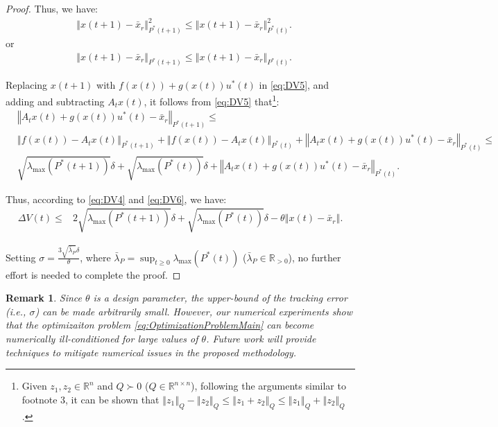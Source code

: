 \documentclass[1p,times]{elsarticle}
\newtheorem{remark}{Remark}
\begin{document}
\begin{proof}
Thus, we have:
\begin{align}\label{eq:DV5}
&\left\Vert x(t+1)-\bar{x}_r\right\Vert_{P^\ast(t+1)}^2\leq\left\Vert x(t+1)-\bar{x}_r\right\Vert_{P^\ast(t)}^2.
\end{align}
or
\begin{align}\label{eq:DV5}
&\left\Vert x(t+1)-\bar{x}_r\right\Vert_{P^\ast(t+1)}\leq\left\Vert x(t+1)-\bar{x}_r\right\Vert_{P^\ast(t)}.
\end{align}

Replacing $x(t+1)$ with $f\left(x(t)\right)+g\left(x(t)\right)u^\ast(t)$ in \eqref{eq:DV5}, and adding and subtracting $A_tx(t)$, it follows from \eqref{eq:DV5} that\footnote{Given $z_1,z_2\in\mathbb{R}^n$ and $Q\succ0$ ($Q\in\mathbb{R}^{n\times n}$), following the arguments similar to footnote 3, it can be shown that $\left\Vert z_1\right\Vert_Q-\left\Vert z_2\right\Vert_Q\leq\left\Vert z_1+z_2\right\Vert_Q\leq\left\Vert z_1\right\Vert_Q+\left\Vert z_2\right\Vert_Q$.}:
\begin{align}\label{eq:DV6}
&\left\Vert A_tx(t)+g\left(x(t)\right)u^\ast(t)-\bar{x}_r\right\Vert_{P^\ast(t+1)}\leq\nonumber\\
&\left\Vert f\left(x(t)\right)-A_tx(t)\right\Vert_{P^\ast(t+1)}+\left\Vert f\left(x(t)\right)-A_tx(t)\right\Vert_{P^\ast(t)}+\left\Vert A_tx(t)+g\left(x(t)\right)u^\ast(t)-\bar{x}_r\right\Vert_{P^\ast(t)}\leq\nonumber\\
&\sqrt{\lambda_{\text{max}}\left(P^\ast(t+1)\right)}\delta+\sqrt{\lambda_{\text{max}}\left(P^\ast(t)\right)}\delta
+\left\Vert A_tx(t)+g\left(x(t)\right)u^\ast(t)-\bar{x}_r\right\Vert_{P^\ast(t)}.
\end{align}


Thus, according to \eqref{eq:DV4} and \eqref{eq:DV6}, we have:
\begin{align}\label{eq:DV7}
\Delta V(t)\leq&2\sqrt{\lambda_{\text{max}}\left(P^\ast(t+1)\right)}\delta+\sqrt{\lambda_{\text{max}}\left(P^\ast(t)\right)}\delta-\theta\left\Vert x(t)-\bar{x}_r\right\Vert.
\end{align}



Setting $\sigma=\frac{3\sqrt{\bar{\lambda}_P}\delta}{\theta}$, where $\bar{\lambda}_P=\sup_{t\geq0}\lambda_{\text{max}}\left(P^\ast(t)\right)$ ($\bar{\lambda}_P\in\mathbb{R}_{>0}$), no further effort is needed to complete the proof.
\end{proof}

\begin{remark}
Since $\theta$ is a design parameter, the upper-bound of the tracking error (i.e., $\sigma$) can be made arbitrarily small. However, our numerical experiments show that the optimizaiton problem \eqref{eq:OptimizationProblemMain} can become  numerically ill-conditioned for large values of $\theta$. Future work will provide techniques to mitigate numerical issues in the proposed methodology. 
\end{remark}
\end{document}
